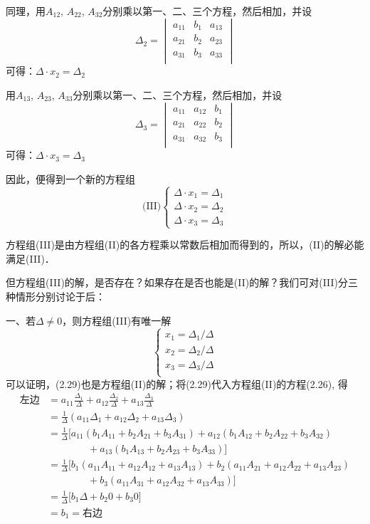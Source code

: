 同理，用$A_{12}$, $A_{22}$, $A_{32}$分别乘以第一、二、三个方程，然后相加，并设
\[\Delta_2=\begin{vmatrix}
    a_{11}&b_1&a_{13}\\
    a_{21}&b_2&a_{23}\\
    a_{31}&b_3&a_{33}\\
\end{vmatrix}\]
可得：$\Delta\cdot  x_2=\Delta_2$

用$A_{13}$, $A_{23}$, $A_{33}$分别乘以第一、二、三个方程，然后相加，并设
\[\Delta_3=\begin{vmatrix}
    a_{11}&a_{12}&b_{1}\\
    a_{21}&a_{22}&b_{2}\\
    a_{31}&a_{32}&b_{3}\\
\end{vmatrix}\]
可得：$\Delta\cdot  x_3=\Delta_3$

因此，便得到一个新的方程组
\[\text{(III)}\begin{cases}
    \Delta\cdot  x_1=\Delta_1\\
    \Delta\cdot  x_2=\Delta_2\\
    \Delta\cdot  x_3=\Delta_3
\end{cases}\]

方程组(III)是由方程组(II)的各方程乘以常数后相加而得到的，所以，(II)的解必能满足(III)．

但方程组(III)的解，是否存在？如果存在是否也能是(II)的解？我们可对(III)分三种情形分别讨论于后：


一、若$\Delta \ne 0$，则方程组(III)有唯一解
\begin{equation}
    \begin{cases}
        x_1=\Delta_1/\Delta\\
        x_2=\Delta_2/\Delta\\
        x_3=\Delta_3/\Delta\\
    \end{cases}
\end{equation}
可以证明，(2.29)也是方程组(II)的解；将(2.29)代入方程组(II)的方程(2.26), 得
\begin{align*}
 \text{左边}&=a_{11}\frac{\Delta_1}{\Delta}+a_{12}\frac{\Delta_2}{\Delta}+a_{13}\frac{\Delta_3}{\Delta}\\   
&=\frac{1}{\Delta}\left(a_{11}\Delta_1+a_{12}\Delta_2+a_{13}\Delta_3\right)\\
&=\frac{1}{\Delta}\big[a_{11}(b_1A_{11}+b_2A_{21}+b_3A_{31})+a_{12}(b_1A_{12}+b_2A_{22}+b_3A_{32})\\
&\qquad \qquad +a_{13}(b_1A_{13}+b_2A_{23}+b_3A_{33})\big]\\
&=\frac{1}{\Delta}\big[b_{1}(a_{11}A_{11}+a_{12}A_{12}+a_{13}A_{13})+b_{2}(a_{11}A_{21}+a_{12}A_{22}+a_{13}A_{23})\\
&\qquad \qquad +b_{3}(a_{11}A_{31}+a_{12}A_{32}+a_{13}A_{33})\big]\\
&=\frac{1}{\Delta}\big[b_1\Delta +b_2 0 +b_3 0\big]\tag{定理10, 11}\\
&=b_1=\text{右边}
\end{align*}

